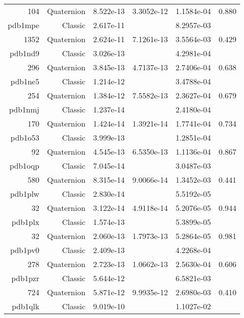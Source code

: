\begin{xltabular}{\textwidth}{r|rS[table-format=1.3e+2]S[table-format=1.4e+2]S[table-format=1.4e+2]S[table-format=-1.3]}
104 & Quaternion & 8.522e-13 & 3.3052e-12 & 1.1584e-04 & 0.880\\  \addlinespace
{\color{red} pdb1mpe } & Classic & 2.617e-11 &  & 8.2957e-03 & \\
1352 & Quaternion & 2.624e-11 & 7.1261e-13 & 3.5564e-03 & 0.429\\  \addlinespace
{\color{red} pdb1nd9 } & Classic & 3.026e-13 &  & 4.2981e-04 & \\
296 & Quaternion & 3.845e-13 & 4.7137e-13 & 2.7406e-04 & 0.638\\  \addlinespace
{\color{red} pdb1ne5 } & Classic & 1.214e-12 &  & 3.4788e-04 & \\
254 & Quaternion & 1.384e-12 & 7.5582e-13 & 2.3627e-04 & 0.679\\  \addlinespace
{\color{red} pdb1nmj } & Classic & 1.237e-14 &  & 2.4180e-04 & \\
170 & Quaternion & 1.424e-14 & 1.3921e-14 & 1.7741e-04 & 0.734\\  \addlinespace
{\color{red} pdb1o53 } & Classic & 3.999e-13 &  & 1.2851e-04 & \\
92 & Quaternion & 4.545e-13 & 6.5350e-13 & 1.1136e-04 & 0.867\\  \addlinespace
{\color{red} pdb1oqp } & Classic & 7.045e-14 &  & 3.0487e-03 & \\
580 & Quaternion & 8.315e-14 & 9.0066e-14 & 1.3452e-03 & 0.441\\  \addlinespace
{\color{red} pdb1plw } & Classic & 2.830e-14 &  & 5.5192e-05 & \\
32 & Quaternion & 3.122e-14 & 4.9118e-14 & 5.2076e-05 & 0.944\\  \addlinespace
{\color{red} pdb1plx } & Classic & 1.574e-13 &  & 5.3899e-05 & \\
32 & Quaternion & 2.060e-13 & 1.7973e-13 & 5.2864e-05 & 0.981\\  \addlinespace
{\color{red} pdb1pv0 } & Classic & 2.409e-13 &  & 4.2268e-04 & \\
278 & Quaternion & 2.723e-13 & 1.0662e-13 & 2.5630e-04 & 0.606\\  \addlinespace
{\color{red} pdb1pzr } & Classic & 5.644e-12 &  & 6.5821e-03 & \\
724 & Quaternion & 5.871e-12 & 9.9935e-12 & 2.6980e-03 & 0.410\\  \addlinespace
{\color{red} pdb1qlk } & Classic & 9.019e-10 &  & 1.1027e-02 & \\

\end{xltabular}
